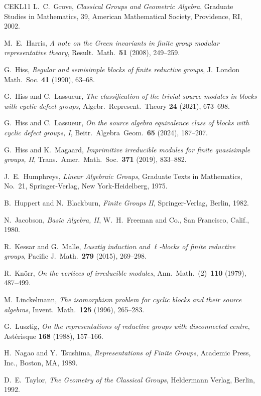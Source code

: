 \documentclass[12pt]{amsart}
\theoremstyle{theorem}
\theoremstyle{definition}
\theoremstyle{remark}
\begin{document}
\begin{thebibliography}{CEKL11}
 L.~C.~Grove, \emph{Classical Groups and Geometric 
        Algebra}, Graduate Studies in Mathematics, 39, American Mathematical 
        Society, Providence, RI, 2002.

 M.~E.~Harris, \emph{A note on the Green invariants in 
        finite group modular representative theory}, Result.\ Math.\ \textbf{51}
        (2008), 249--259.

G.~Hiss, \emph{Regular and semisimple blocks of finite 
        reductive groups}, J.~London Math.\ Soc.  \textbf{41} (1990), 63--68.

 G.~Hiss and C.~Lassueur, \emph{The classification of the 
	trivial source modules in blocks with cyclic defect groups}, Algebr.\ 
	Represent.\ Theory \textbf{24} (2021), 673--698.

 G.~Hiss and C.~Lassueur, \emph{On the source algebra 
        equivalence class of blocks with cyclic defect groups, I}, 
        Beitr.\ Algebra\ Geom.\ \textbf{65} (2024), 187--207.

 G.~Hiss and K.~Magaard, \emph{Imprimitive irreducible 
        modules for finite quasisimple groups, II}, Trans.\ Amer.\ Math.\ Soc.\ 
        \textbf{371} (2019), 833--882. 

  J.~E.~Humphreys, \emph{Linear Algebraic Groups}, 
        Graduate Texts in Mathematics, No.\ 21, Springer-Verlag, 
        New York-Heidelberg, 1975.

 B.~Huppert and N.~Blackburn, \emph{Finite Groups II},
        Springer-Verlag, Berlin, 1982.

 N.~Jacobson, \emph{Basic Algebra, II}, W.~H.~Freeman and 
        Co., San Francisco, Calif., 1980. 

 R.~Kessar and G.~Malle, \emph{Lusztig induction and 
        $\ell$-blocks of finite reductive groups}, Pacific J.~Math.\ 
        \textbf{279} (2015), 269--298.

\bibitem[Kno79]{Knoerr79} R.~Kn{\"o}rr, \emph{On the vertices of irreducible 
        modules}, Ann.\ Math.\ (2)\ \textbf{110} (1979), 487--499.

\bibitem[Li96]{Li96} M.~Linckelmann, \emph{The isomorphism problem for cyclic 
        blocks and their source algebras}, Invent.\ Math.\ \textbf{125} (1996), 
        265--283.

\bibitem[Lu88]{Lu} G.~Lusztig, \emph{On the representations of reductive groups 
        with disconnected centre}, Ast\'erisque \textbf{168} (1988), 157--166.

\bibitem[NT89]{NaTs} H.~Nagao and Y.~Tsushima, \emph{Representations of Finite
        Groups}, Academic Press, Inc., Boston, MA, 1989.

\bibitem[Tay92]{Taylor} {D.~E.~Taylor}, \emph{The Geometry of the Classical 
        Groups}, Heldermann Verlag, Berlin, 1992.

\end{thebibliography}
\end{document}
